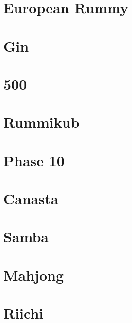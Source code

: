 


\maketitle





\section{European Rummy}

\section{Gin}

\section{500}

\section{Rummikub}

\section{Phase 10}

\section{Canasta}

\section{Samba}

\section{Mahjong}

\section{Riichi}


